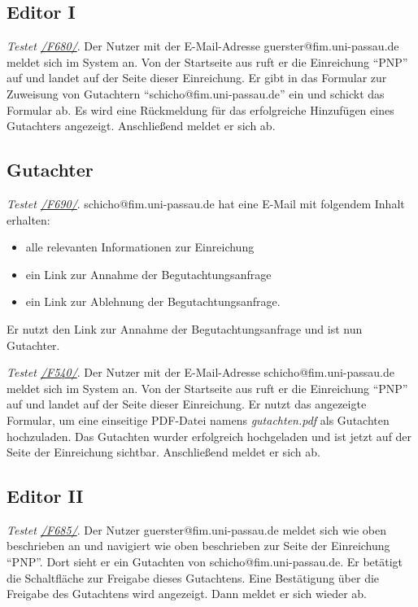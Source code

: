 \subsection{Editor I}
\begin{description}

	 \emph{Testet \hyperref[funkt:680]{/F680/}}.
	Der Nutzer mit der E-Mail-Adresse guerster@fim.uni-passau.de meldet sich im System an.
	Von der Startseite aus ruft er die Einreichung ``P\neq NP'' auf und landet auf der Seite dieser Einreichung.
	Er gibt in das Formular zur Zuweisung von Gutachtern ``schicho@fim.uni-passau.de'' ein und schickt das Formular ab.
	Es wird eine Rückmeldung für das erfolgreiche Hinzufügen eines Gutachters angezeigt.
	Anschließend meldet er sich ab.

\end{description}

\subsection{Gutachter}
\begin{description}

	 \emph{Testet \hyperref[funkt:690]{/F690/}}.
	schicho@fim.uni-passau.de hat eine E-Mail mit folgendem Inhalt erhalten:
	\begin{itemize}
		\item alle relevanten Informationen zur Einreichung
		\item ein Link zur Annahme der Begutachtungsanfrage
		\item ein Link zur Ablehnung der Begutachtungsanfrage.
	\end{itemize}
	Er nutzt den Link zur Annahme der Begutachtungsanfrage und ist nun Gutachter.

	 \emph{Testet \hyperref[funkt:540]{/F540/}}.
	Der Nutzer mit der E-Mail-Adresse schicho@fim.uni-passau.de meldet sich im System an.
	Von der Startseite aus ruft er die Einreichung ``P\neq NP'' auf und landet auf der Seite dieser Einreichung.
	Er nutzt das angezeigte Formular, um eine einseitige PDF-Datei namens \emph{gutachten.pdf} als Gutachten hochzuladen.
	Das Gutachten wurder erfolgreich hochgeladen und ist jetzt auf der Seite der Einreichung sichtbar.
	Anschließend meldet er sich ab.

\end{description}

\subsection{Editor II}
\begin{description}

	 \emph{Testet \hyperref[funkt:685]{/F685/}}.
	Der Nutzer guerster@fim.uni-passau.de meldet sich wie oben beschrieben an und navigiert wie oben beschrieben zur Seite der Einreichung ``P\neq NP''.
	Dort sieht er ein Gutachten von schicho@fim.uni-passau.de.
	Er betätigt die Schaltfläche zur Freigabe dieses Gutachtens.
	Eine Bestätigung über die Freigabe des Gutachtens wird angezeigt.
	Dann meldet er sich wieder ab.

\end{description}

